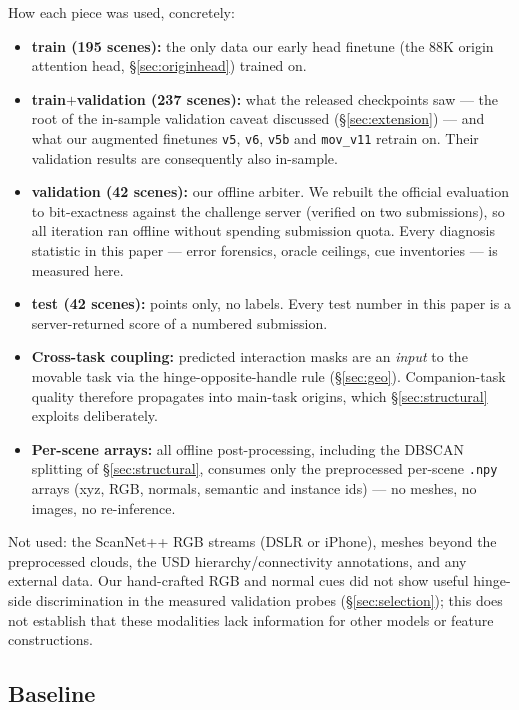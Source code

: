 \documentclass[11pt]{article}
\begin{document}
How each piece was used, concretely:
\begin{itemize}
\item \textbf{train (195 scenes):} the only data our early head finetune
  (the $88$K origin attention head, \S\ref{sec:originhead}) trained on.
\item \textbf{train$+$validation (237 scenes):} what the released
  checkpoints saw --- the root of the in-sample validation caveat discussed (\S\ref{sec:extension}) --- and what our augmented
  finetunes \texttt{v5}, \texttt{v6}, \texttt{v5b} and \texttt{mov\_v11} retrain on.
  Their validation results are consequently also in-sample.
\item \textbf{validation (42 scenes):} our offline arbiter. We rebuilt the
  official evaluation to bit-exactness against the challenge server
  (verified on two submissions), so all iteration ran offline without
  spending submission quota. Every diagnosis statistic in this paper ---
  error forensics, oracle ceilings, cue inventories --- is measured here.
\item \textbf{test (42 scenes):} points only, no labels. Every test number
  in this paper is a server-returned score of a numbered submission.
\item \textbf{Cross-task coupling:} predicted interaction masks are an
  \emph{input} to the movable task via the hinge-opposite-handle rule
  (\S\ref{sec:geo}). Companion-task quality therefore propagates into
  main-task origins, which \S\ref{sec:structural} exploits deliberately.
\item \textbf{Per-scene arrays:} all offline post-processing, including the
  DBSCAN splitting of \S\ref{sec:structural}, consumes only the preprocessed
  per-scene \texttt{.npy} arrays (xyz, RGB, normals, semantic and instance
  ids) --- no meshes, no images, no re-inference.
\end{itemize}
Not used: the ScanNet++ RGB streams (DSLR or iPhone), meshes beyond the
preprocessed clouds, the USD hierarchy/connectivity annotations, and any
external data. Our hand-crafted RGB and normal cues did not show useful
hinge-side discrimination in the measured validation probes
(\S\ref{sec:selection}); this does not establish that these modalities
lack information for other models or feature constructions.

\subsection{Baseline}
\end{document}
